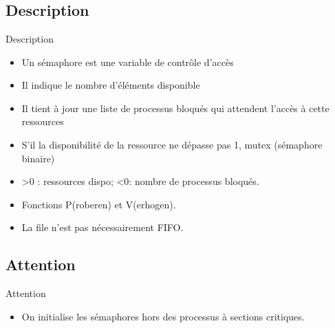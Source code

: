 \section{\sectitle}
\begin{frame}{\sectitle}
\def\subsectitle{Description}
\subsection{\subsectitle}
\begin{block}{\subsectitle}
\begin{itemize}
\item Un sémaphore est une variable de contrôle d'accès
\item Il indique le nombre d'éléments disponible
\item Il tient à jour une liste de processus bloqués qui attendent l'accès à
cette ressources
\item S'il la disponibilité de la ressource ne dépasse pas 1, mutex (sémaphore
binaire)
\item >0 : ressources dispo; <0: nombre de processus bloqués.
\item Fonctions P(roberen) et V(erhogen).
\item La file n'est pas nécessairement FIFO.
\end{itemize}
\end{block}
\def\subsectitle{Attention}
\subsection{\subsectitle}
\begin{alertblock}{\subsectitle}
\begin{itemize}
\item On initialise les sémaphores hors des processus à sections critiques.
\end{itemize}
\end{alertblock}
\end{frame}

\def\sectitle{Sémaphore}

